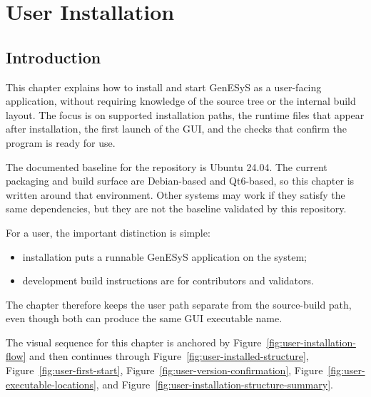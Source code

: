\chapter{User Installation}
\label{chap:user-installation}

\section{Introduction}
\label{sec:user-installation-introduction}

This chapter explains how to install and start GenESyS as a user-facing
application, without requiring knowledge of the source tree or the internal
build layout. The focus is on supported installation paths, the runtime files
that appear after installation, the first launch of the GUI, and the checks
that confirm the program is ready for use.

The documented baseline for the repository is Ubuntu 24.04. The current
packaging and build surface are Debian-based and Qt6-based, so this chapter is
written around that environment. Other systems may work if they satisfy the
same dependencies, but they are not the baseline validated by this repository.

For a user, the important distinction is simple:
\begin{itemize}
\item installation puts a runnable GenESyS application on the system;
\item development build instructions are for contributors and validators.
\end{itemize}

The chapter therefore keeps the user path separate from the source-build path,
even though both can produce the same GUI executable name.

The visual sequence for this chapter is anchored by Figure~\ref{fig:user-installation-flow}
and then continues through Figure~\ref{fig:user-installed-structure},
Figure~\ref{fig:user-first-start},
Figure~\ref{fig:user-version-confirmation},
Figure~\ref{fig:user-executable-locations}, and
Figure~\ref{fig:user-installation-structure-summary}.


